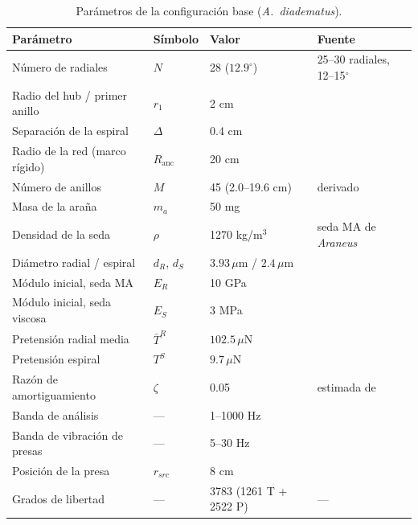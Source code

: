 \documentclass[11pt,letterpaper]{article}
\newcommand{\um}{\,\mu\mathrm{m}}
\newcommand{\uN}{\,\mu\mathrm{N}}
\begin{document}
\begin{table}[H]
\centering\small
\caption{Parámetros de la configuración base (\textit{A.~diadematus}).}
\label{tab:param}
\begin{tabular}{@{}p{4.9cm}lp{3.9cm}p{4.3cm}@{}}
\toprule
Parámetro & Símbolo & Valor & Fuente \\
\midrule
Número de radiales & $N$ & 28 ($12.9^\circ$) & 25--30 radiales, 12--15$^\circ$ \cite{adwAraneus} \\
Radio del hub / primer anillo & $r_1$ & 2 cm & \cite{yavuz2024} \\
Separación de la espiral & $\Delta$ & 0.4 cm & \cite{yavuz2024} \\
Radio de la red (marco rígido) & $R_{\text{anc}}$ & 20 cm & \cite{yavuz2024} \\
Número de anillos & $M$ & 45 (2.0--19.6 cm) & derivado \\
Masa de la araña & $m_a$ & 50 mg & \cite{yavuz2024} \\
Densidad de la seda & $\rho$ & 1270 kg/m$^3$ & seda MA de \textit{Araneus} \cite{stauffer1994} \\
Diámetro radial / espiral & $d_R$, $d_S$ & $3.93\um$ / $2.4\um$ & \cite{yavuz2024} \\
Módulo inicial, seda MA & $E_R$ & 10 GPa & \cite{gosline1999} \\
Módulo inicial, seda viscosa & $E_S$ & 3 MPa & \cite{gosline1999} \\
Pretensión radial media & $\bar{T}^R$ & $102.5\uN$ & \cite{yavuz2024} \\
Pretensión espiral & $T^S$ & $9.7\uN$ & \cite{yavuz2024} \\
Razón de amortiguamiento & $\zeta$ & 0.05 & estimada de \cite{gosline1999} \\
Banda de análisis & --- & 1--1000 Hz & \cite{landolfa1996,yavuz2024} \\
Banda de vibración de presas & --- & 5--30 Hz & \cite{landolfa1996} \\
Posición de la presa & $r_{src}$ & 8 cm & \cite{yavuz2024} \\
\midrule
Grados de libertad & --- & 3783 (1261 T + 2522 P) & --- \\
\bottomrule
\end{tabular}
\end{table}
\end{document}
